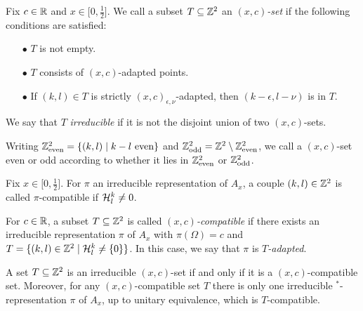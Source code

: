 \begin{Def} Fix $c\in \mathbb{R}$ and $x\in \lbrack 0,\frac{1}{2}\rbrack$. We call a subset $T\subseteq \mathbb{Z}^2$ an \emph{$(x,c)$-set} if the following conditions are satisfied: 
\begin{itemize} 
\item[$\bullet$] $T$ is not empty.
\item[$\bullet$] $T$ consists of $(x,c)$-adapted points.
\item[$\bullet$] If $(k,l)\in T$ is strictly $(x,c)_{\epsilon,\nu}$-adapted, then $(k-\epsilon,l-\nu)$ is in $T$.
\end{itemize}

We say that $T$ \emph{irreducible} if it is not the disjoint union of two $(x,c)$-sets.

Writing $\mathbb{Z}^2_{\mathrm{even}} = \{(k,l)\mid k-l \textrm{ even}\}$ and $\mathbb{Z}^2_{\mathrm{odd}} = \mathbb{Z}^2\setminus \mathbb{Z}^2_{\mathrm{even}}$, we call a $(x,c)$-set even or odd according to whether it lies in $\mathbb{Z}^2_{\mathrm{even}}$ or $\mathbb{Z}^2_{\mathrm{odd}}$.
\end{Def}

\begin{Def} Fix $x\in \lbrack 0,\frac{1}{2}\rbrack$. For $\pi$ an irreducible representation of $A_x$, a couple $(k,l)\in \mathbb{Z}^2$ is called $\pi$-compatible if $\mathcal{H}^k_l\neq 0$. 

For $c\in \mathbb{R}$, a subset $T\subseteq \mathbb{Z}^2$ is called \emph{$(x,c)$-compatible} if there exists an irreducible representation $\pi$ of $A_x$ with $\pi(\Omega) = c$ and $T=\{(k,l)\in \mathbb{Z}^2\mid \mathcal{H}^{k}_{l}\neq \{0\}\}$. In this case, we say that $\pi$ is \emph{$T$-adapted}.
\end{Def}

\begin{Prop}\label{PropClassRep} A set $T\subseteq \mathbb{Z}^2$ is an irreducible $(x,c)$-set if and only if it is a $(x,c)$-compatible set. Moreover, for any $(x,c)$-compatible set $T$ there is only one irreducible $^*$-representation $\pi$ of $A_x$, up to unitary equivalence, which is $T$-compatible.
\end{Prop}

